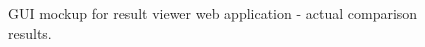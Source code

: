 \documentclass[11pt,oneside,final]{fithesis2}
\begin{document}
\begin{figure}[!htb]
    \begin{center}
    \leavevmode
    \centerline{}
    \end{center}
    \caption{GUI mockup for result viewer web application - actual comparison results.}
    \label{fig:comparisonResultMock}
\end{figure}

    \pagestyle{plain}
    
\end{document}
